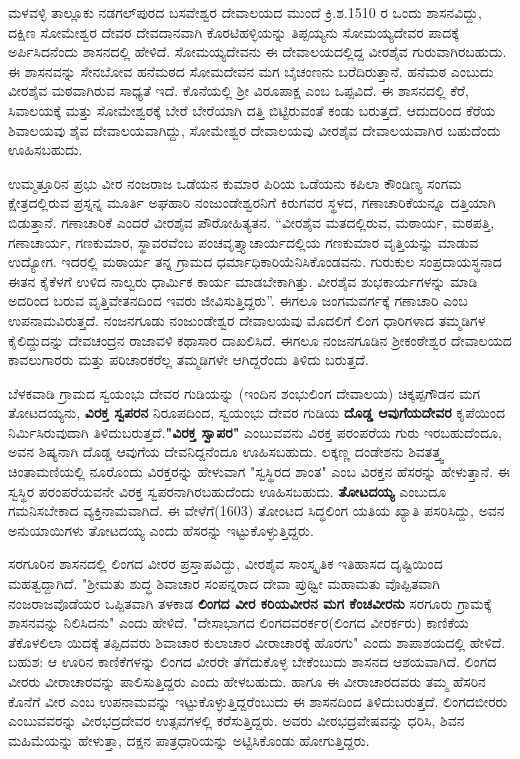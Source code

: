 ಮಳವಳ್ಳಿ ತಾಲ್ಲೂಕು ನಡಗಲ್​ಪುರದ ಬಸವೇಶ್ವರ ದೇವಾಲಯದ ಮುಂದೆ ಕ್ರಿ.ಶ.1510 ರ ಒಂದು ಶಾಸನವಿದ್ದು, ದಕ್ಷಿಣ ಸೋಮೇಶ್ವರ ದೇವರ ದೇವದಾನವಾಗಿ ಕೊರಟಿಹಳ್ಳಿಯನ್ನು ತಿಪ್ಪಯ್ಯನು ಸೋಮಯ್ಯದೇವರ ಪಾದಕ್ಕೆ ಅರ್ಪಿಸಿದನೆಂದು ಶಾಸನದಲ್ಲಿ ಹೇಳಿದೆ. ಸೋಮಯ್ಯದೇವನು ಈ ದೇವಾಲಯದಲ್ಲಿದ್ದ ವೀರಶೈವ ಗುರುವಾಗಿರಬಹುದು. ಈ ಶಾಸನವನ್ನು ಸೇನಬೋವ ಹನೆಮಠದ ಸೋಮದೇವನ ಮಗ ಬೈಚಂಣನು ಬರೆದಿರುತ್ತಾನೆ. ಹನೆಮಠ ಎಂಬುದು ವೀರಶೈವ ಮಠವಾಗಿರುವ ಸಾಧ್ಯತೆ ಇದೆ. ಕೊನೆಯಲ್ಲಿ ಶ‍್ರೀ ವಿರೂಪಾಕ್ಷ ಎಂಬ ಒಪ್ಪವಿದೆ. ಈ ಶಾಸನದಲ್ಲಿ ಕೆರೆ, ಸಿವಾಲಯಕ್ಕೆ ಮತ್ತು ಸೋಮೇಶ್ವರಕ್ಕೆ ಬೇರೆ ಬೇರೆಯಾಗಿ ದತ್ತಿ ಬಿಟ್ಟಿರುವಂತೆ ಕಂಡು ಬರುತ್ತದೆ. ಆದುದರಿಂದ ಕೆರೆಯ ಶಿವಾಲಯವು ಶೈವ ದೇವಾಲಯವಾಗಿದ್ದು, ಸೋಮೇಶ್ವರ ದೇವಾಲಯವು ವೀರಶೈವ ದೇವಾಲಯವಾಗಿರ ಬಹುದೆಂದು ಊಹಿಸಬಹುದು.

ಉಮ್ಮತ್ತೂರಿನ ಪ್ರಭು ವೀರ ನಂಜರಾಜ ಒಡೆಯನ ಕುಮಾರ ಪಿರಿಯ ಒಡೆಯನು ಕಪಿಲಾ ಕೌಂಡಿಣ್ಯ ಸಂಗಮ ಕ್ಷೇತ್ರದಲ್ಲಿರುವ ಪ್ರಸ್ನನ್ನ ಮೂರ್ತಿ ಅಘಹಾರಿ ನಂಜುಂಡೇಶ್ವರನಿಗೆ ಕಿರುಗವರ ಸ್ಥಳದ, ಗಣಾಚಾರಿಕೆಯನ್ನೂ ದತ್ತಿಯಾಗಿ ಬಿಡುತ್ತಾನೆ. ಗಣಾಚಾರಿಕೆ ಎಂದರೆ ವೀರಶೈವ ಪೌರೋಹಿತ್ಯತನ. “ವೀರಶೈವ ಮತದಲ್ಲಿರುವ, ಮಠಾರ್ಯ, ಮಠಪತ್ತಿ, ಗಣಾಚಾರ್ಯ, ಗಣಕುಮಾರ, ಸ್ಥಾವರವೆಂಬ ಪಂಚವೃತ್ತ್ಯಾಚಾರ್ಯದಲ್ಲಿಯ ಗಣಕುಮಾರ ವೃತ್ತಿಯನ್ನು ಮಾಡುವ ಉದ್ಯೋಗ. ಇದರಲ್ಲಿ ಮಠಾರ್ಯ ತನ್ನ ಗ್ರಾಮದ ಧರ್ಮಾಧಿಕಾರಿಯೆನಿಸಿಕೊಂಡವನು. ಗುರುಕುಲ ಸಂಪ್ರದಾಯಸ್ಥನಾದ ಈತನ ಕೈಕೆಳಗೆ ಉಳಿದ ನಾಲ್ವರು ಧಾರ್ಮಿಕ ಕಾರ್ಯ ಮಾಡಬೇಕಾಗಿತ್ತು. ವೀರಶೈವ ಶುಭಕಾರ್ಯಗಳನ್ನು ಮಾಡಿ ಅದರಿಂದ ಬರುವ ವೃತ್ತಿವೇತನದಿಂದ ಇವರು ಜೀವಿಸುತ್ತಿದ್ದರು”. ಈಗಲೂ ಜಂಗಮವರ್ಗಕ್ಕೆ ಗಣಾಚಾರಿ ಎಂಬ ಉಪನಾಮವಿರುತ್ತದೆ. ನಂಜನಗೂಡು ನಂಜುಂಡೇಶ್ವರ ದೇವಾಲಯವು ಮೊದಲಿಗೆ ಲಿಂಗ ಧಾರಿಗಳಾದ ತಮ್ಮಡಿಗಳ ಕೈಲಿದ್ದುದನ್ನು ದೇವಚಂದ್ರನ ರಾಜಾವಳಿ ಕಥಾಸಾರ ದಾಖಲಿಸಿದೆ. ಈಗಲೂ ನಂಜನಗೂಡಿನ ಶ‍್ರೀಕಂಠೇಶ್ವರ ದೇವಾಲಯದ ಕಾವಲುಗಾರರು ಮತ್ತು ಪರಿಚಾರಕರೆಲ್ಲ ತಮ್ಮಡಿಗಳೇ ಆಗಿದ್ದರೆಂದು ತಿಳಿದು ಬರುತ್ತದೆ.

ಬೆಳಕವಾಡಿ ಗ್ರಾಮದ ಸ್ವಯಂಭು ದೇವರ ಗುಡಿಯನ್ನು (ಇಂದಿನ ಶಂಭುಲಿಂಗ ದೇವಾಲಯ) ಚಿಕ್ಕಪ್ಪಗೌಡನ ಮಗ ತೋಟದಯ್ಯನು, \textbf{ವಿರಕ್ತ ಸ್ವಪರನ} ನಿರೂಪದಿಂದ, ಸ್ವಯಂಭು ದೇವರ ಗುಡಿಯ \textbf{ದೊಡ್ಡ ಆವುಗೆಯದೇವರ} ಕೃಪೆಯಿಂದ ನಿರ್ಮಿಸಿರುವುದಾಗಿ ತಿಳಿದುಬರುತ್ತದೆ.\textbf{"ವಿರಕ್ತ ಸ್ವಾಪರ"} ಎಂಬುವವನು ವಿರಕ್ತ ಪರಂಪರೆಯ ಗುರು ಇರಬಹುದೆಂದೂ, ಅವನ ಶಿಷ್ಯನಾಗಿ ದೊಡ್ಡ ಆವುಗೆಯ ದೇವನಿದ್ದನೆಂದೂ ಊಹಿಸಬಹುದು. ಲಕ್ಕಣ್ಣ ದಂಡೇಶನು ಶಿವತತ್ತ್ವ ಚಿಂತಾಮಣಿಯಲ್ಲಿ ನೂರೊಂದು ವಿರಕ್ತರನ್ನು ಹೇಳುವಾಗ "ಸ್ವಸ್ಥಿರದ ಶಾಂತ" ಎಂಬ ವಿರಕ್ತನ ಹೆಸರನ್ನು ಹೇಳುತ್ತಾನೆ. ಈ ಸ್ವಸ್ಥಿರ ಪರಂಪರೆಯವನೇ ವಿರಕ್ತ ಸ್ವಪರನಾಗಿರಬಹುದೆಂದು ಊಹಿಸಬಹುದು. \textbf{ತೋಟದಯ್ಯ }ಎಂಬುದೂ ಗಮನಿಸಬೇಕಾದ ವ್ಯಕ್ತಿನಾಮವಾಗಿದೆ. ಈ ವೇಳೆಗೆ(1603) ತೋಂಟದ ಸಿದ್ಧಲಿಂಗ ಯತಿಯ ಖ್ಯಾತಿ ಪಸರಿಸಿದ್ದು, ಅವನ ಅನುಯಾಯಿಗಳು ತೋಟದಯ್ಯ ಎಂದು ಹೆಸರನ್ನು ಇಟ್ಟುಕೊಳ್ಳುತ್ತಿದ್ದರು.

ಸರಗೂರಿನ ಶಾಸನದಲ್ಲಿ ಲಿಂಗದ ವೀರರ ಪ್ರಸ್ತಾಪವಿದ್ದು, ವೀರಶೈವ ಸಾಂಸ್ಕೃತಿಕ ಇತಿಹಾಸದ ದೃಷ್ಟಿಯಿಂದ ಮಹತ್ವದ್ದಾಗಿದೆ. "ಶ‍್ರೀಮತು ಶುದ್ಧ ಶಿವಾಚಾರ ಸಂಪನ್ನರಾದ ದೇವಾ ಪ್ರುಥ್ವೀ ಮಹಾಮತು ವೊಪ್ಪಿತವಾಗಿ ನಂಜರಾಜವೊಡೆಯರ ಒಪ್ಪಿತವಾಗಿ ತಳಕಾಡ \textbf{ಲಿಂಗದ ವೀರ ಕರಿಯವೀರನ ಮಗ ಕೆಂಚವೀರನು} ಸರಗೂರು ಗ್ರಾಮಕ್ಕೆ ಶಾಸನವನ್ನು ನಿಲಿಸಿದನು" ಎಂದು ಹೇಳಿದೆ. "ದೇಸಾಭಾಗದ ಲಿಂಗದವರರ್ಕರ(ಲಿಂಗದ ವೀರರ್ಕರು) ಕಾಣಿಕೆಯ ತೆಕೊಳಲಿಲಾ ಯಿದಕ್ಕೆ ತಪ್ಪಿದವರು ಶಿವಾಚಾರ ಕುಲಾಚಾರ ವೀರಾಚಾರಕ್ಕೆ ಹೊರಗು" ಎಂದು ಶಾಪಾಶಯದಲ್ಲಿ ಹೇಳಿದೆ. ಬಹುಶ: ಆ ಊರಿನ ಕಾಣಿಕೆಗಳನ್ನು ಲಿಂಗದ ವೀರರೇ ತೆಗೆದುಕೊಳ್ಳ ಬೇಕೆಂಬುದು ಶಾಸನದ ಆಶಯವಾಗಿದೆ. ಲಿಂಗದ ವೀರರು ವೀರಾಚಾರವನ್ನು ಪಾಲಿಸುತ್ತಿದ್ದರು ಎಂದು ಹೇಳಬಹುದು. ಹಾಗೂ ಈ ವೀರಾಚಾರದವರು ತಮ್ಮ ಹೆಸರಿನ ಕೊನೆಗೆ ವೀರ ಎಂಬ ಉಪನಾಮವನ್ನು ಇಟ್ಟುಕೊಳ್ಳುತ್ತಿದ್ದರೆಂಬುದು ಈ ಶಾಸನದಿಂದ ತಿಳಿದುಬರುತ್ತದೆ. ಲಿಂಗದಬೀರರು ಎಂಬುವವರನ್ನು ವೀರಭದ್ರದೇವರ ಉತ್ಸವಗಳಲ್ಲಿ ಕರೆಸುತ್ತಿದ್ದರು. ಅವರು ವೀರಭದ್ರವೇಷವನ್ನು ಧರಿಸಿ, ಶಿವನ ಮಹಿಮೆಯನ್ನು ಹೇಳುತ್ತಾ, ದಕ್ಷನ ಪಾತ್ರಧಾರಿಯನ್ನು ಅಟ್ಟಿಸಿಕೊಂಡು ಹೋಗುತ್ತಿದ್ದರು.


